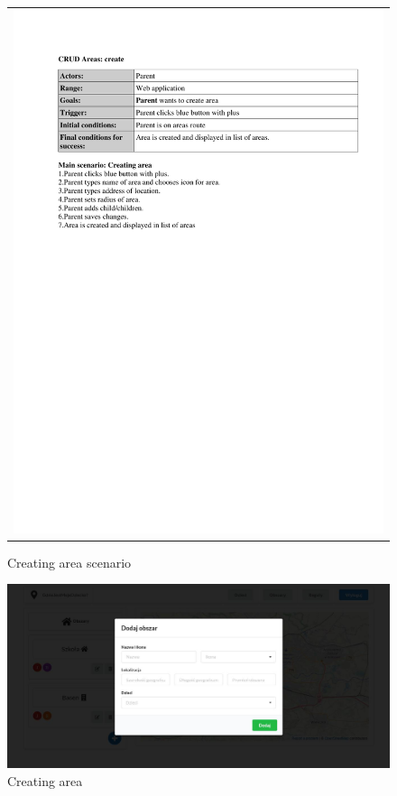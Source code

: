 \documentclass{sprawozdanie-agh}
\begin{document}
		\begin{figure}[H] 
			\centering
			\begin{tabular}{c}
				\includegraphics[width=.80\textwidth]{areaCreate} 
			\end{tabular} 
		\caption{Creating area scenario}
		\end{figure}

		\begin{figure}[H]
			\centering
			\includegraphics[width=.80\textwidth]{addArea}
			\caption{Creating area}
		\end{figure}
\end{document}
